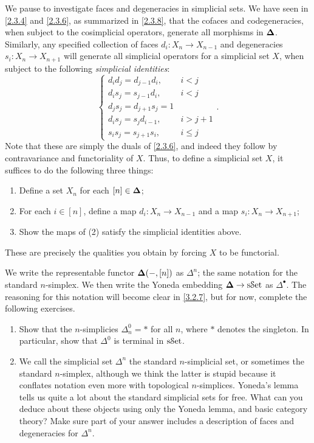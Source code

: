 \begin{remark}\label{3.1.7}
    We pause to investigate faces and degeneracies in simplicial sets. We have seen in \cref{2.3.4} and \cref{2.3.6}, as summarized in \cref{2.3.8}, that the cofaces and codegeneracies, when subject to the cosimplicial operators, generate all morphisms in $\boldsymbol{\Delta}$. Similarly, any specified collection of faces $d_i : X_n \to X_{n-1}$ and degeneracies $s_i : X_n\to X_{n+1}$ will generate all simplicial operators for a simplicial set $X$, when subject to the following \emph{simplicial identities}:
    \[
    \begin{cases}
        d_id_j = d_{j-1}d_i,& i<j\\
        d_is_j = s_{j-1}d_i, & i<j\\
        d_js_j=d_{j+1}s_j=1&\\
        d_is_j=s_jd_{i-1},&i>j+1\\
        s_is_j=s_{j+1}s_i,&i\leq j
    \end{cases}.
    \]
    Note that these are simply the duals of \cref{2.3.6}, and indeed they follow by contravariance and functoriality of $X$. Thus, to define a simplicial set $X$, it suffices to do the following three things:
    \begin{enumerate}
        \item Define a set $X_n$ for each $[n]\in\boldsymbol{\Delta}$;
        \item For each $i\in[n]$, define a map $d_i : X_n\to X_{n-1}$ and a map $s_i : X_n \to X_{n+1}$;
        \item Show the maps of (2) satisfy the simplicial identities above.
    \end{enumerate}
    These are precisely the qualities you obtain by forcing $X$ to be functorial.
\end{remark}

\begin{exercise}\label{3.1.8}
    We write the representable functor $\boldsymbol{\Delta}(-,[n])$ as $\Delta^n$; the same notation for the standard $n$-simplex. We then write the Yoneda embedding $\boldsymbol{\Delta}\to\mathrm{s}\mathcal{S}\mathrm{et}$ as $\Delta^\bullet$. The reasoning for this notation will become clear in \cref{3.2.7}, but for now, complete the following exercises.
    \begin{enumerate}
        \item Show that the $n$-simplicies $\Delta^0_n=*$ for all $n$, where $*$ denotes the singleton. In particular, show that $\Delta^0$ is terminal in $\mathrm{s}\mathcal{S}\mathrm{et}$.
        \item We call the simplicial set $\Delta^n$ the standard $n$-simplicial set, or sometimes the standard $n$-simplex, although we think the latter is stupid because it conflates notation even more with topological $n$-simplices. Yoneda's lemma tells us quite a lot about the standard simplicial sets for free. What can you deduce about these objects using only the Yoneda lemma, and basic category theory? Make sure part of your answer includes a description of faces and degeneracies for $\Delta^n$.
    \end{enumerate}
\end{exercise}

